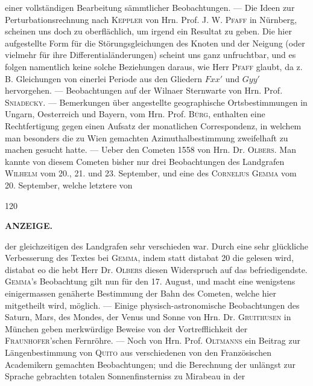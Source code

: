 einer vollständigen Bearbeitung sämmtlicher Beobachtungen. --- Die Ideen zur Perturbationsrechnung nach \textsc{Keppler} von Hrn. Prof. J. W. \textsc{Pfaff} in Nürnberg, scheinen uns doch zu oberflächlich, um irgend ein Resultat zu geben. Die hier aufgestellte Form für die Störungsgleichungen des Knoten und der Neigung (oder vielmehr für ihre Differentialänderungen) scheint uns ganz unfruchtbar, und es folgen namentlich keine solche Beziehungen daraus, wie Herr \textsc{Pfaff} glaubt, da z. B. Gleichungen von einerlei Periode aus den Gliedern $Fxx'$ und $Gyy'$ hervorgehen. --- Beobachtungen auf der Wilnaer Sternwarte von Hrn. Prof. \textsc{Sniadecky}. --- Bemerkungen über angestellte geographische Ortsbestimmungen in Ungarn, Oesterreich und Bayern, vom Hrn. Prof. \textsc{Bürg}, enthalten eine Rechtfertigung gegen einen Aufsatz der monatlichen Correspondenz, in welchem man besonders die zu Wien gemachten Azimuthalbestimmung zweifelhaft zu machen gesucht hatte. --- Ueber den Cometen 1558 von Hrn. Dr. \textsc{Olbers}. Man kannte von diesem Cometen bisher nur drei Beobachtungen des Landgrafen \textsc{Wilhelm} vom 20., 21. und 23. September, und eine des \textsc{Cornelius Gemma} vom 20. September, welche letztere von
\par
\vfill{}\hfill{\small 120}\hspace*{.18\linewidth}\par
\clearpage
\thispagestyle{empty}
\noindent{}%
%
\parbox[t]{\dimexpr\linewidth-24mm\relax}{\centering\footnotesize\bfseries ANZEIGE.}%
\makebox[12mm][r]{}\par\nobreak\medskip
\noindent der gleichzeitigen des Landgrafen sehr verschieden war. Durch eine sehr glückliche Verbesserung des
Textes bei \textsc{Gemma}, indem statt distabat 20 die gelesen wird, distabat eo die hebt Herr Dr. \textsc{Olbers} diesen Widerspruch auf das befriedigendste. \textsc{Gemma}'s Beobachtung gilt nun für den 17. August, und macht
eine wenigstens einigermassen genäherte Bestimmung der Bahn des Cometen, welche hier mitgetheilt
wird, möglich. --- Einige physisch-astronomische Beobachtungen des Saturn, Mars, des Mondes, der
Venus und Sonne von Hrn. Dr. \textsc{Gruithusen} in München geben merkwürdige Beweise von der Vortrefflichkeit der \textsc{Fraunhofer}'schen Fernröhre. --- Noch von Hrn. Prof. \textsc{Oltmanns} ein Beitrag zur Längenbestimmung von \textsc{Quito} aus verschiedenen von den Französischen Academikern gemachten Beobachtungen;
und die Berechnung der unlängst zur Sprache gebrachten totalen Sonnenfinsterniss zu Mirabeau in der
